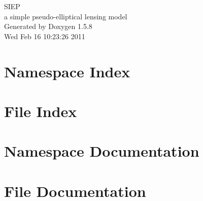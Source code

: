 \documentclass[a4paper]{book}
\begin{document}
\begin{titlepage}
\vspace*{7cm}
\begin{center}
{\Large SIEP \\[1ex]\large a simple pseudo-elliptical lensing model }\\
\vspace*{1cm}
{\large Generated by Doxygen 1.5.8}\\
\vspace*{0.5cm}
{\small Wed Feb 16 10:23:26 2011}\\
\end{center}
\end{titlepage}
\clearemptydoublepage
{}
\tableofcontents
\clearemptydoublepage
{}
\chapter{Namespace Index}

\chapter{File Index}

\chapter{Namespace Documentation}

\chapter{File Documentation}




\printindex
\end{document}
